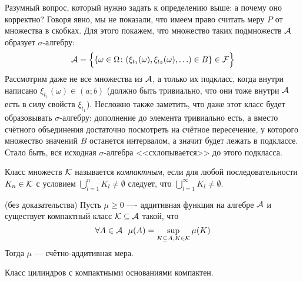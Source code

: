 \begin{note}
	Разумный вопрос, который нужно задать к определению выше: а почему оно корректно? Говоря явно, мы не показали, что имеем право считать меру $P$ от множества в скобках. Для этого покажем, что множество таких подмножеств $\mathcal{A}$ образует $\sigma$-алгебру:
	\[
		\mathcal{A} = \Big\{\{\omega \in \Omega \colon (\xi_{t_1}(\omega), \xi_{t_2}(\omega), \ldots) \in B\} \in \mathcal{F}\Big\}
	\]
	Рассмотрим даже не все множества из $\mathcal{A}$, а только их подкласс, когда внутри написано $\xi_{t_1}(\omega) \in (a; b)$ (должно быть тривиально, что они тоже внутри $\mathcal{A}$ есть в силу свойств $\xi_{t_1}$). Несложно также заметить, что даже этот класс будет образовывать $\sigma$-алгебру: дополнение до элемента тривиально есть, а вместо счётного объединения достаточно посмотреть на счётное пересечение, у которого множество значений $B$ останется интервалом, а значит будет лежать в подклассе. Стало быть, вся исходная $\sigma$-алгебра <<схлопывается>> до этого подкласса.
\end{note}

\begin{definition}
	Класс множеств $\mathcal{K}$ называется \textit{компактным}, если для любой последовательности $K_n \in \mathcal{K}$ с условием $\bigcup_{l = 1}^n K_l \neq \emptyset$ следует, что  $\bigcup_{l = 1}^\infty K_l \neq \emptyset$.
\end{definition}

\begin{proposition} (без доказательства)
	Пусть $\mu \ge 0$ ---- аддитивная функция на алгебре $\mathcal{A}$ и существует компактный класс $\mathcal{K} \subseteq \mathcal{A}$ такой, что
	\[
		\forall A \in \cA\ \ \mu(A) = \sup_{K \subseteq A, K \in \cK} \mu(K)
	\]
	Тогда $\mu$ --- счётно-аддитивная мера.
\end{proposition}

\begin{exercise}
	Класс цилиндров с компактными основаниями компактен.
\end{exercise}
